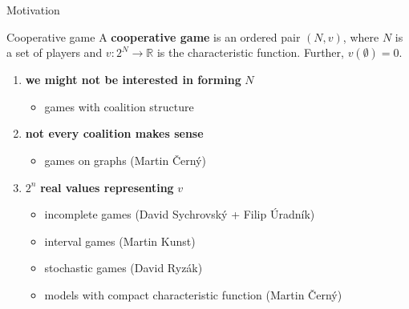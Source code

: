 \documentclass{beamer}
\begin{document}


\begin{frame}{Motivation}
    \begin{block}{Cooperative game}
        A \textbf{cooperative game} is an ordered pair $(N,v)$, where $N$ is a set of players and $v\colon 2^N \to \mathbb{R}$ is the characteristic function. Further, $v(\emptyset) = 0$.
    \end{block}
	\begin{enumerate}
		\item \textbf{we might not be interested in forming} $N$
		\begin{itemize}
			\item<2-> games with coalition structure
		\end{itemize}
		\item \textbf{not every coalition makes sense}
		\begin{itemize}
			\item<3-> games on graphs (Martin Černý)
		\end{itemize}
		\item $2^n$ \textbf{real values representing} $v$
		\begin{itemize}
			\item<4-> incomplete games (David Sychrovský + Filip Úradník)
			\item<4-> interval games (Martin Kunst)
			\item<4-> stochastic games (David Ryzák)
			\item<4-> models with compact characteristic function (Martin Černý)
		\end{itemize}
	\end{enumerate}
\end{frame}

\end{document}
